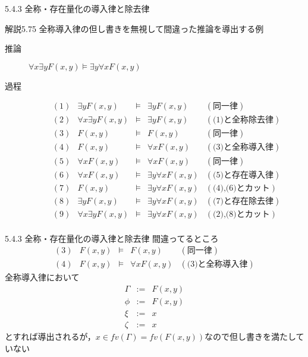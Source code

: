 \documentclass[dvipdfmx,11pt]{beamer}
\begin{document}
\begin{frame}{5.4.3 全称・存在量化の導入律と除去律}
  \begin{block}{解説5.75}
    全称導入律の但し書きを無視して間違った推論を導出する例

    \begin{description}
    \item [推論] \(\forall x \exists y F(x,y) \vDash \exists y \forall x F(x,y) \)
    \item [過程]
      \[
      \begin{array}{rrcll}
        (1) & \exists y F(x,y) & \vDash & \exists y F(x,y) & (\textit{同一律}) \\
        (2) & \forall x \exists y F(x,y) & \vDash & \exists y F(x,y) & (\textit{(1)と全称除去律}) \\
        (3) & F(x,y) & \vDash & F(x,y) & (\textit{同一律}) \\
        (4) & F(x,y) & \vDash & \forall x F(x,y) & (\textit{(3)と全称導入律}) \\
        (5) & \forall x F(x,y) & \vDash & \forall x F(x,y) & (\textit{同一律}) \\
        (6) & \forall x F(x,y) & \vDash & \exists y \forall x F(x,y) & (\textit{(5)と存在導入律}) \\
        (7) & F(x,y) & \vDash & \exists y \forall x F(x,y) & (\textit{(4),(6)とカット}) \\
        (8) & \exists y F(x,y) & \vDash & \exists y \forall x F(x,y) & (\textit{(7)と存在除去律}) \\
        (9) & \forall x \exists y F(x,y) & \vDash & \exists y \forall x F(x,y) & (\textit{(2),(8)とカット}) \\
      \end{array}
      \]
    \end{description}
  \end{block}
\end{frame}

\begin{frame}{5.4.3 全称・存在量化の導入律と除去律}
  間違ってるところ
  \[
  \begin{array}{rrcll}
    (3) & F(x,y) & \vDash & F(x,y) & (\textit{同一律}) \\
    (4) & F(x,y) & \vDash & \forall x F(x,y) & (\textit{(3)と全称導入律})
  \end{array}
  \]
  全称導入律において
  \[
  \begin{array}{rcl}
    \Gamma & := & F(x,y) \\
    \phi & := & F(x,y) \\
    \xi & := & x \\
    \zeta & := & x
  \end{array}
  \]
  とすれば導出されるが，\(x \in \textit{fv}(\Gamma) = \textit{fv}(F(x,y))\)なので但し書きを満たしていない
\end{frame}
\end{document}
